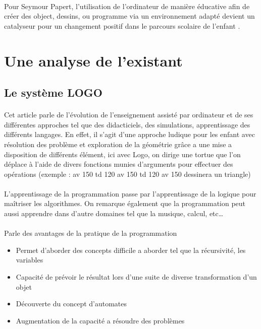 \documentclass[a4paper]{article}
\begin{document}
\paragraph{}
Pour Seymour Papert, l’utilisation de l’ordinateur de manière éducative afin de créer des object, dessins, ou programme via un environnement adapté devient un catalyseur pour un changement positif dans le parcours scolaire de l’enfant \cite{clements1999young}.

\section{Une analyse de l’existant}
\subsection{Le système LOGO}

\paragraph{}
Cet article \cite{mendelsohn1985enfant} parle de l’évolution de l’enseignement assisté par ordinateur et de ses différentes approches tel que des didacticiels, des simulations, apprentissage des différents langages. En effet, il s’agit d’une approche ludique pour les enfant avec résolution des problème et exploration de la géométrie grâce a une mise a disposition de différents élément, ici avec Logo, on dirige une tortue que l’on déplace à l’aide de divers fonctions munies d’arguments pour effectuer des opérations (exemple : av 150 td 120 av 150 td 120 av 150 dessinera un triangle)

\paragraph{}
L’apprentissage de la programmation passe par l’apprentissage de la logique pour maîtriser les algorithmes. On remarque également que la programmation peut aussi apprendre dans d’autre domaines tel que la musique, calcul, etc…

\paragraph{}
Parle des avantages de la pratique de la programmation
\begin{itemize}
\item Permet d’aborder des concepts difficile a aborder tel que la récursivité, les variables
\item Capacité de prévoir le résultat lors d’une suite de diverse transformation d’un objet
\item Découverte du concept d’automates
\item Augmentation de la capacité a résoudre des problèmes
\end{itemize}
\end{document}
